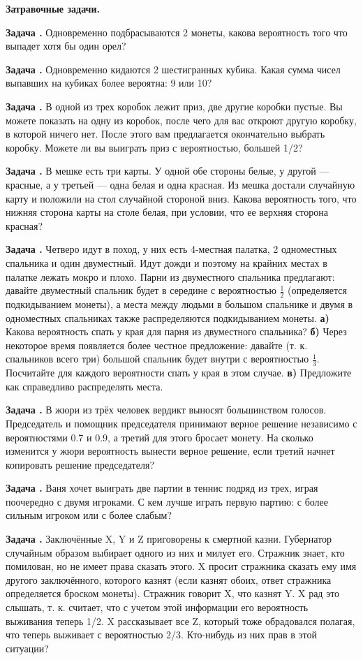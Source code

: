 \documentclass[11pt,a4paper]{article}
\newcounter{znum}
\newcommand{\z}[1]{\addtocounter{znum}{1} \textbf{Задача \arabic{znum}#1. }}
\renewcommand{\!}{\textcolor{red}{!}}
\begin{document}
\pagestyle{empty}

\begin{center}
	\large
	\textbf{Затравочные задачи.}\\
\end{center}

\z{} Одновременно подбрасываются 2 монеты, какова вероятность того что выпадет хотя бы один орел?

\z{} Одновременно кидаются 2 шестигранных кубика. Какая сумма чисел выпавших на кубиках более вероятна: 9 или 10?

\z{} В одной из трех коробок лежит приз, две другие коробки пустые. Вы можете показать на одну из коробок, после чего для вас откроют другую коробку, в которой ничего нет. После этого вам предлагается окончательно выбрать коробку. Можете ли вы выиграть приз с вероятностью, большей 1/2?

\z{} В мешке есть три карты. У одной обе стороны белые, у другой --- красные, а у третьей --- одна белая и одна красная. Из мешка достали случайную карту и положили на стол случайной стороной вниз. Какова вероятность того, что нижняя сторона карты на столе белая, при условии, что ее верхняя сторона красная?

\z{} Четверо идут в поход, у них есть 4-местная палатка, 2 одноместных спальника и один двуместный. Идут дожди и поэтому на крайних местах в палатке лежать мокро и плохо. Парни из двуместного спальника предлагают: давайте двуместный спальник будет в середине с вероятностью $\frac12$ (определяется подкидыванием монеты), а места между людьми в большом спальнике и двумя в одноместных спальниках также распределяются подкидыванием монеты.
\textbf{а)} Какова вероятность спать у края для парня из двуместного спальника?
\textbf{б)} Через некоторое время появляется более честное предложение: давайте (т. к. спальников всего три) большой спальник будет внутри с вероятностью $\frac13$. Посчитайте для каждого вероятности спать у края в этом случае.
\textbf{в)} Предложите как справедливо распределять места.

\z{} В жюри из трёх человек вердикт выносят большинством голосов. Председатель и помощник председателя принимают верное решение независимо с вероятностями 0.7 и 0.9, а третий для этого бросает монету. На сколько изменится у жюри вероятность вынести верное решение, если третий начнет копировать решение председателя?

\z{} Ваня хочет выиграть две партии в теннис подряд из трех, играя поочередно с двумя игроками. С кем лучше играть первую партию: с более сильным игроком или с более слабым?

\z{} Заключённые X, Y и Z приговорены к смертной казни. Губернатор случайным образом выбирает одного из них и милует его. Стражник знает, кто помилован, но не имеет права сказать этого. X просит стражника сказать ему имя другого заключённого, которого казнят (если казнят обоих, ответ стражника определяется броском монеты). Стражник говорит X, что казнят Y. X рад это слышать, т. к. считает, что с учетом этой информации его вероятность выживания теперь 1/2. X рассказывает все Z, который тоже обрадовался полагая, что теперь выживает с вероятностью 2/3. Кто-нибудь из них прав в этой ситуации?
\end{document}
